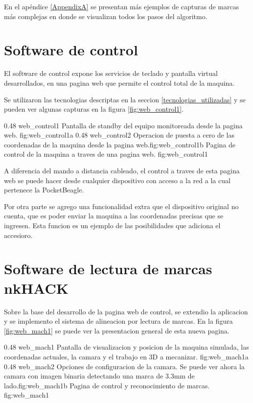          En el apéndice \ref{AppendixA} se presentan más ejemplos de capturas de marcas más complejas en donde se visualizan todos los pasos del algoritmo.\par

\section{Software de control}

   El software de control expone los servicios de teclado y pantalla virtual desarrollados, en una pagina web que permite el control total de la maquina.\par
   Se utilizaron las tecnologias descriptas en la seccion \ref{tecnologias_utilizadas} y se pueden ver algunas capturas en la figura \ref{fig:web_control1}.

\subfigab 
{0.48} {web_control1} {Pantalla de standby del equipo monitoreada desde la pagina web.} {fig:web_control1a}
{0.48} {web_control2} {Operacion de puesta a cero de las coordenadas de la maquina desde la pagina web.}{fig:web_control1b}
      {Pagina de control de la maquina a traves de una pagina web.}
      {fig:web_control1}

   A diferencia del mando a distancia cableado, el control a traves de esta pagina web se puede hacer desde cualquier dispositivo con acceso a la red a la cual pertenece la PocketBeagle.\par
   Por otra parte se agrego una funcionalidad extra que el dispositivo original no cuenta, que es poder enviar la maquina a las coordenadas precisas que se ingresen. Esta funcion es un ejemplo de las posibilidades que adiciona el accesioro.\par

\section{Software de lectura de marcas nkHACK}

Sobre la base del desarrollo de la pagina web de control, se extendio la aplicacion y se implemento el sistema de alineacion por lectura de marcas.
   En la figura \ref{fig:web_mach1} se puede ver la presentacion general de esta nueva pagina.

\subfigab 
{0.48} {web_mach1} {Pantalla de visualizacion y posicion de la maquina simulada, las coordenadas actuales, la camara y el trabajo en 3D a mecanizar.} {fig:web_mach1a}
{0.48} {web_mach2} {Opciones de configuracion de la camara. Se puede ver ahora la camara con imagen binaria detectando una marca de 3.3mm de lado.}{fig:web_mach1b}
      {Pagina de control y reconocimiento de marcas.}
      {fig:web_mach1}

